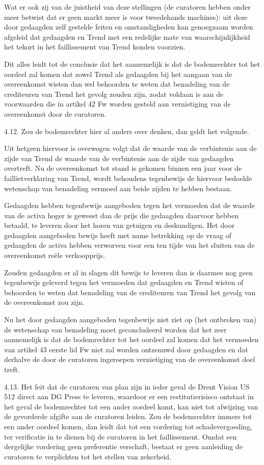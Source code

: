 \documentclass[
  dutch,
  a4paper,
]{article}
\begin{document}
Wat er ook zij van de juistheid van deze stellingen (de curatoren hebben onder meer betwist dat er geen markt meer is voor tweedehands machines): uit deze door gedaagden zelf gestelde feiten en omstandigheden kan genoegzaam worden afgeleid dat gedaagden en Trend met een redelijke mate van waarschijnlijkheid het tekort in het faillissement van Trend konden voorzien.

Dit alles leidt tot de conclusie dat het aannemelijk is dat de bodemrechter tot het oordeel zal komen dat zowel Trend als gedaagden bij het aangaan van de overeenkomst wisten dan wel behoorden te weten dat benadeling van de crediteuren van Trend het gevolg zouden zijn, zodat voldaan is aan de voorwaarden die in artikel 42 Fw worden gesteld aan vernietiging van de overeenkomst door de curatoren.

4.12. Zou de bodemrechter hier al anders over denken, dan geldt het volgende.

Uit hetgeen hiervoor is overwogen volgt dat de waarde van de verbintenis aan de zijde van Trend de waarde van de verbintenis aan de zijde van gedaagden overtreft. Nu de overeenkomst tot stand is gekomen binnen een jaar voor de faillietverklaring van Trend, wordt behoudens tegenbewijs de hiervoor bedoelde wetenschap van benadeling vermoed aan beide zijden te hebben bestaan.

Gedaagden hebben tegenbewijs aangeboden tegen het vermoeden dat de waarde van de activa hoger is geweest dan de prijs die gedaagden daarvoor hebben betaald, te leveren door het horen van getuigen en deskundigen. Het door gedaagden aangeboden bewijs heeft met name betrekking op de vraag of gedaagden de activa hebben verworven voor een ten tijde van het sluiten van de overeenkomst reële verkoopprijs.

Zouden gedaagden er al in slagen dit bewijs te leveren dan is daarmee nog geen tegenbewijs geleverd tegen het vermoeden dat gedaagden en Trend wisten of behoorden te weten dat benadeling van de crediteuren van Trend het gevolg van de overeenkomst zou zijn.

Nu het door gedaagden aangeboden tegenbewijs niet ziet op (het ontbreken van) de wetenschap van benadeling moet geconcludeerd worden dat het zeer aannemelijk is dat de bodemrechter tot het oordeel zal komen dat het vermoeden van artikel 43 eerste lid Fw niet zal worden ontzenuwd door gedaagden en dat derhalve de door de curatoren ingeroepen vernietiging van de overeenkomst doel treft.

4.13. Het feit dat de curatoren van plan zijn in ieder geval de Drent Vision US 512 direct aan DG Press te leveren, waardoor er een restitutierisisco ontstaat in het geval de bodemrechter tot een ander oordeel komt, kan niet tot afwijzing van de gevorderde afgifte aan de curatoren leiden. Zou de bodemrechter immers tot een ander oordeel komen, dan leidt dat tot een vordering tot schadevergoeding, ter verificatie in te dienen bij de curatoren in het faillissement. Omdat een dergelijke vordering geen preferentie verschaft, bestaat er geen aanleiding de curatoren te verplichten tot het stellen van zekerheid.
\end{document}
